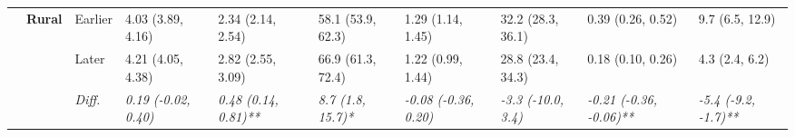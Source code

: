 \documentclass[12pt, a4paper]{article}
\begin{document}
\begin{appendices}
\begin{table}[!p]
{\begin{tabular}[t]{>{}l>{}lllllllll}
        \cmidrule{2-10}
                                              & \multirow{3}{*}{\textbf{Rural}} & Earlier                       & 4.03 (3.89, 4.16)                           & 2.34 (2.14, 2.54)                            & 58.1 (53.9, 62.3)                           & 1.29 (1.14, 1.45)                             & 32.2 (28.3, 36.1)                             & 0.39 (0.26, 0.52)                               & 9.7 (6.5, 12.9)                               \\
        \cmidrule{3-10}
                                              &                                 & Later                         & 4.21 (4.05, 4.38)                           & 2.82 (2.55, 3.09)                            & 66.9 (61.3, 72.4)                           & 1.22 (0.99, 1.44)                             & 28.8 (23.4, 34.3)                             & 0.18 (0.10, 0.26)                               & 4.3 (2.4, 6.2)                                \\
        \cmidrule{3-10}
                                              &                                 & \cellcolor{gray!10}\em{Diff.} & \cellcolor{gray!10}\em{0.19 (-0.02, 0.40)}  & \cellcolor{gray!10}\em{0.48 (0.14, 0.81)**}  & \cellcolor{gray!10}\em{8.7 (1.8, 15.7)*}    & \cellcolor{gray!10}\em{-0.08 (-0.36, 0.20)}   & \cellcolor{gray!10}\em{-3.3 (-10.0, 3.4)}     & \cellcolor{gray!10}\em{-0.21 (-0.36, -0.06)**}  & \cellcolor{gray!10}\em{-5.4 (-9.2, -1.7)**}   \\
        \bottomrule
      \end{tabular}}
  \end{table}
  \vspace*{\fill}

\end{appendices}
\end{document}
